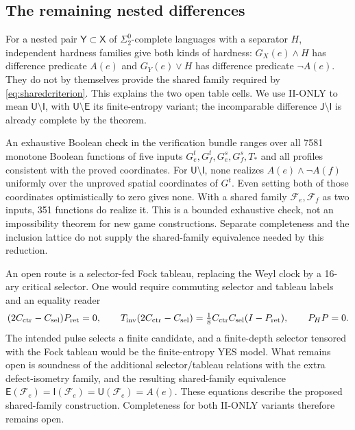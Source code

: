 \subsection{The remaining nested differences}
For a nested pair $\mathsf Y\subset\mathsf X$ of $\Sigma^0_2$-complete
languages with a separator $H$, independent hardness families give
both kinds of hardness: $G_X(e)\wedge H$ has difference predicate
$A(e)$ and $G_Y(e)\vee H$ has difference predicate $\neg A(e)$.
They do not by themselves provide the shared family required by
\eqref{eq:sharedcriterion}. This explains the two open table cells.
We use II-ONLY to mean $\mathsf U\setminus\mathsf I$, with
$\mathsf U\setminus\mathsf E$ its finite-entropy variant; the
incomparable difference $\mathsf J\setminus\mathsf I$ is already
complete by the theorem.

\begin{remark}
An exhaustive Boolean check in the verification bundle ranges over all 7581
monotone Boolean functions of five inputs
$G^t_e,G^t_f,G^s_e,G^s_f,T_*$ and all profiles consistent with the
proved coordinates. For $\mathsf U\setminus\mathsf I$, none realizes
$A(e)\wedge\neg A(f)$ uniformly over the unproved spatial coordinates
of $G^t$. Even setting both of those coordinates optimistically to
zero gives none. With a shared family $\mathcal F_e,\mathcal F_f$ as two inputs,
351 functions do realize it. This is a bounded exhaustive check,
not an impossibility theorem for new game constructions. Separate completeness and the inclusion lattice do not supply
the shared-family equivalence needed by this reduction.
\end{remark}

An open route is a selector-fed Fock tableau, replacing the Weyl
clock by a 16-ary critical selector. One would require commuting
selector and tableau labels and an equality reader
\[
 (2C_{\rm ctr}-C_{\rm sel})P_{\rm ret}=0,\qquad
 T_{\rm inv}(2C_{\rm ctr}-C_{\rm sel})
 =\tfrac18 C_{\rm ctr}C_{\rm sel}(I-P_{\rm ret}),
 \qquad P_HP=0.
\]
The intended pulse selects a finite candidate, and a finite-depth
selector tensored with the Fock tableau would be the finite-entropy
YES model. What remains open is soundness of the additional selector/tableau
relations with the extra defect-isometry family, and the resulting
shared-family equivalence
$\mathsf E(\mathcal F_e)=\mathsf I(\mathcal F_e)=\mathsf U(\mathcal F_e)=A(e)$.
These equations describe the proposed shared-family construction. Completeness for both
II-ONLY variants therefore remains open.

